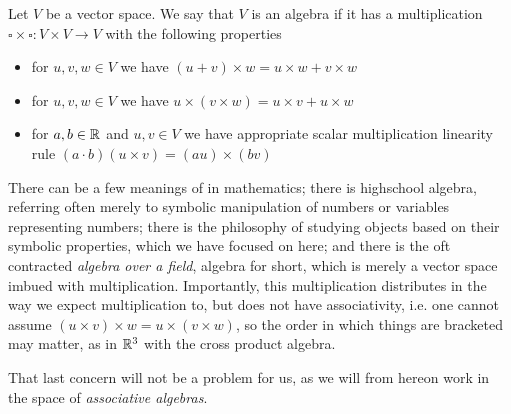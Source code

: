 \documentclass[11pt]{article}
\begin{document}
\begin{definition}[Algebra]
Let $V$ be a vector space. We say that $V$ is an algebra if it has a multiplication $\square \times \square \colon V \times V \to V$ with the following properties \begin{itemize}
\item for $u,v,w \in V$ we have $(u + v) \times w = u \times w + v \times w$
\item for $u,v,w\in V$ we have $u \times (v \times w) = u \times v + u \times w$
\item for $a,b \in \mathbb{R}$ and $u,v\in V$ we have appropriate scalar multiplication linearity rule $(a \cdot b)(u \times v) = (au) \times (b v)$
\end{itemize}
\end{definition}

There can be a few meanings of  in mathematics; there is highschool algebra, referring often merely to symbolic manipulation of numbers or variables representing numbers; there is the philosophy of studying objects based on their symbolic properties, which we have focused on here; and there is the oft contracted \emph{algebra over a field}, algebra for short, which is merely a vector space imbued with multiplication. Importantly, this multiplication distributes in the way we expect multiplication to, but does not have associativity, i.e. one cannot assume $(u \times v) \times w = u \times (v \times w)$, so the order in which things are bracketed may matter, as in $\mathbb{R}^3$ with the cross product algebra.

That last concern will not be a problem for us, as we will from hereon work in the space of \emph{associative algebras}.
\end{document}
